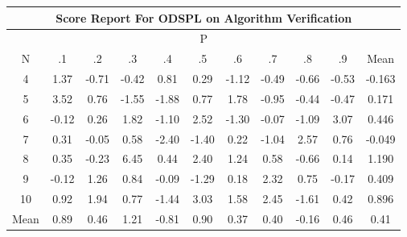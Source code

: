 \documentclass[11pt,a4paper]{report}
\begin{document}
\begin{longtable}{ | c || c | c | c | c | c | c | c | c | c || c |}
\hline
\multicolumn{11}{|c|}{ Score Report For ODSPL on Algorithm Verification} \\
\hline
\multicolumn{11}{|c|}{ P } \\
\hline
N & .1 & .2 & .3 & .4 & .5 & .6 & .7 & .8 & .9 & Mean\\
 \hline
 \hline
 \endhead
  4 &  \cellcolor[HTML]{DFDFFF} 1.37 &  \cellcolor[HTML]{FFEFEF} -0.71 &  \cellcolor[HTML]{FFF7F7} -0.42 &  \cellcolor[HTML]{E7E7FF} 0.81 &  \cellcolor[HTML]{F7F7FF} 0.29 &  \cellcolor[HTML]{FFDFDF} -1.12 &  \cellcolor[HTML]{FFEFEF} -0.49 &  \cellcolor[HTML]{FFEFEF} -0.66 &  \cellcolor[HTML]{FFEFEF} -0.53 & -0.163 \\
  5 &  \cellcolor[HTML]{A7A7FF} 3.52 &  \cellcolor[HTML]{EFEFFF} 0.76 &  \cellcolor[HTML]{FFD7D7} -1.55 &  \cellcolor[HTML]{FFCFCF} -1.88 &  \cellcolor[HTML]{EFEFFF} 0.77 &  \cellcolor[HTML]{CFCFFF} 1.78 &  \cellcolor[HTML]{FFE7E7} -0.95 &  \cellcolor[HTML]{FFF7F7} -0.44 &  \cellcolor[HTML]{FFF7F7} -0.47 & 0.171 \\
  6 &  \cellcolor[HTML]{FFFFFF} -0.12 &  \cellcolor[HTML]{F7F7FF} 0.26 &  \cellcolor[HTML]{CFCFFF} 1.82 &  \cellcolor[HTML]{FFE7E7} -1.10 &  \cellcolor[HTML]{BFBFFF} 2.52 &  \cellcolor[HTML]{FFDFDF} -1.30 &  \cellcolor[HTML]{FFFFFF} -0.07 &  \cellcolor[HTML]{FFE7E7} -1.09 &  \cellcolor[HTML]{AFAFFF} 3.07 & 0.446 \\
  7 &  \cellcolor[HTML]{F7F7FF} 0.31 &  \cellcolor[HTML]{FFFFFF} -0.05 &  \cellcolor[HTML]{EFEFFF} 0.58 &  \cellcolor[HTML]{FFBFBF} -2.40 &  \cellcolor[HTML]{FFDFDF} -1.40 &  \cellcolor[HTML]{F7F7FF} 0.22 &  \cellcolor[HTML]{FFE7E7} -1.04 &  \cellcolor[HTML]{BFBFFF} 2.57 &  \cellcolor[HTML]{EFEFFF} 0.76 & -0.049 \\
  8 &  \cellcolor[HTML]{F7F7FF} 0.35 &  \cellcolor[HTML]{FFF7F7} -0.23 &  \cellcolor[HTML]{6060FF} 6.45 &  \cellcolor[HTML]{F7F7FF} 0.44 &  \cellcolor[HTML]{BFBFFF} 2.40 &  \cellcolor[HTML]{DFDFFF} 1.24 &  \cellcolor[HTML]{EFEFFF} 0.58 &  \cellcolor[HTML]{FFEFEF} -0.66 &  \cellcolor[HTML]{FFFFFF} 0.14 & 1.190 \\
  9 &  \cellcolor[HTML]{FFFFFF} -0.12 &  \cellcolor[HTML]{DFDFFF} 1.26 &  \cellcolor[HTML]{E7E7FF} 0.84 &  \cellcolor[HTML]{FFFFFF} -0.09 &  \cellcolor[HTML]{FFDFDF} -1.29 &  \cellcolor[HTML]{F7F7FF} 0.18 &  \cellcolor[HTML]{C7C7FF} 2.32 &  \cellcolor[HTML]{EFEFFF} 0.75 &  \cellcolor[HTML]{FFF7F7} -0.17 & 0.409 \\
  10 &  \cellcolor[HTML]{E7E7FF} 0.92 &  \cellcolor[HTML]{CFCFFF} 1.94 &  \cellcolor[HTML]{EFEFFF} 0.77 &  \cellcolor[HTML]{FFD7D7} -1.44 &  \cellcolor[HTML]{AFAFFF} 3.03 &  \cellcolor[HTML]{D7D7FF} 1.58 &  \cellcolor[HTML]{BFBFFF} 2.45 &  \cellcolor[HTML]{FFD7D7} -1.61 &  \cellcolor[HTML]{F7F7FF} 0.42 & 0.896 \\
 \hline
 \hline
Mean &  \cellcolor[HTML]{E7E7FF} 0.89 &  \cellcolor[HTML]{F7F7FF} 0.46 &  \cellcolor[HTML]{DFDFFF} 1.21 &  \cellcolor[HTML]{FFE7E7} -0.81 &  \cellcolor[HTML]{E7E7FF} 0.90 &  \cellcolor[HTML]{F7F7FF} 0.37 &  \cellcolor[HTML]{F7F7FF} 0.40 &  \cellcolor[HTML]{FFF7F7} -0.16 &  \cellcolor[HTML]{F7F7FF} 0.46 &  \cellcolor[HTML]{F7F7FF} 0.41
\end{longtable}
\end{document}
